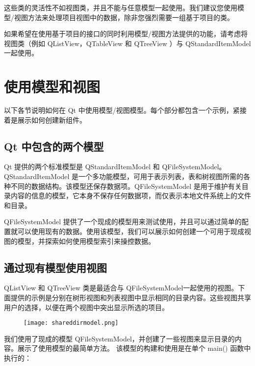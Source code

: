 这些类的灵活性不如视图类，并且不能与任意模型一起使用。我们建议您使用模型/视图方法来处理项目视图中的数据，除非您强烈需要一组基于项目的类。

如果希望在使用基于项目的接口的同时利用模型/视图方法提供的功能，请考虑将视图类（例如 QListView，QTableView 和 QTreeView ）与 QStandardItemModel 一起使用。

\section{使用模型和视图}

以下各节说明如何在 Qt 中使用模型/视图模型。每个部分都包含一个示例，紧接着是展示如何创建新组件。

\subsection{Qt 中包含的两个模型}

Qt 提供的两个标准模型是 QStandardItemModel 和 QFileSystemModel。QStandardItemModel 是一个多功能模型，可用于表示列表，表和树视图所需的各种不同的数据结构。该模型还保存数据项。QFileSystemModel 是用于维护有关目录内容的信息的模型，它本身不保存任何数据项，而仅表示本地文件系统上的文件和目录。

QFileSystemModel 提供了一个现成的模型用来测试使用，并且可以通过简单的配置就可以使用现有的数据。使用该模型，我们可以展示如何创建一个可用于现成视图的模型，并探索如何使用模型索引来操控数据。

\subsection{通过现有模型使用视图}

QListView 和 QTreeView 类是最适合与 QFileSystemModel一起使用的视图。下面提供的示例是分别在树形视图和列表视图中显示相同的目录内容。这些视图共享用户的选择，以便在两个视图中突出显示所选的项目。

\begin{figure}[hpt!]  
	\centering
    \texttt{[image: shareddirmodel.png]}
\end{figure}

我们使用了现成的模型 QFileSystemModel，并创建了一些视图来显示目录的内容。展示了使用模型的最简单方法。 该模型的构建和使用是在单个 main() 函数中执行的：


